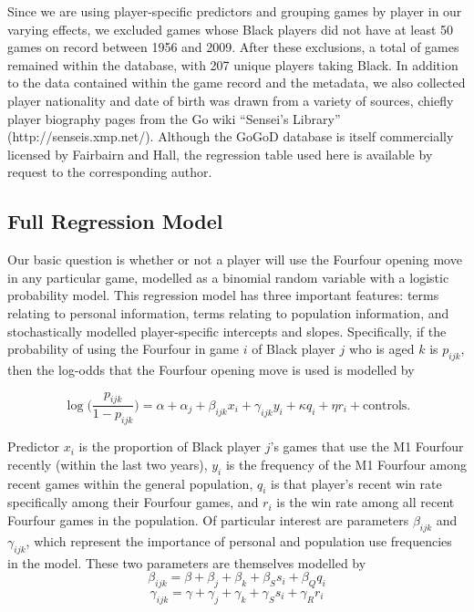 \documentclass[reqno,12pt]{amsart}
\begin{document}
Since we are using player-specific predictors and grouping games by player in our varying effects, we excluded games whose Black players did not have at least 50 games on record between 1956 and 2009. After these exclusions, a total of \nGamesExcluded{} games remained within the database, with 207 unique players taking Black. In addition to the data contained within the game record and the metadata, we also collected player nationality and date of birth was drawn from a variety of sources, chiefly player biography pages from the Go wiki ``Sensei's Library'' (http://senseis.xmp.net/). Although the GoGoD database is itself commercially licensed by Fairbairn and Hall, the regression table used here is available by request to the corresponding author.


\subsection{Full Regression Model}

Our basic question is whether or not a player will use the Fourfour opening move in any particular game, modelled as a binomial random variable with a logistic probability model. This regression model has three important features: terms relating to personal information, terms relating to population information, and stochastically modelled player-specific intercepts and slopes. Specifically, if the probability of using the Fourfour in game $i$ of Black player $j$ who is aged $k$ is $p_{ijk}$, then the log-odds that the Fourfour opening move is used is modelled by

\begin{equation} \label{eq:model}
  \log\bigg(\frac{p_{ijk}}{1-p_{ijk}}\bigg) = \alpha + \alpha_j + \beta_{ijk}x_i + \gamma_{ijk}y_i + \kappa q_i + \eta r_i + \textrm{controls}.
\end{equation}

Predictor $x_i$ is the proportion of Black player $j$'s games that use the M1 Fourfour recently (within the last two years), $y_i$ is the frequency of the M1 Fourfour among recent games within the general population, $q_i$ is that player's recent win rate specifically among their Fourfour games, and $r_i$ is the win rate among all recent Fourfour games in the population. Of particular interest are parameters $\beta_{ijk}$ and $\gamma_{ijk}$, which represent the importance of personal and population use frequencies in the model. These two parameters are themselves modelled by
$$
  \beta_{ijk} = \beta + \beta_j + \beta_k + \beta_{S} s_{i} + \beta_{Q} q_{i}
$$
$$
  \gamma_{ijk} = \gamma + \gamma_j + \gamma_k + \gamma_{S} s_{i} + \gamma_{R} r_{i}
$$
\end{document}
